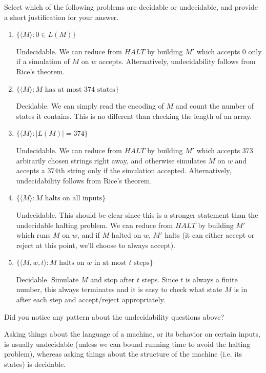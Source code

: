 \documentclass[fleqn]{article}
\begin{document}
\noindent Select which of the following problems are decidable or undecidable, and provide a short justification for your answer.
\begin{enumerate}
    \item $\{\langle M \rangle : 0 \in L(M)\}$
    \begin{answer}
        Undecidable. We can reduce from $HALT$ by building $M'$ which accepts $0$ only if a simulation of $M$ on $w$ accepts. Alternatively, undecidability follows from Rice's theorem.
    \end{answer}
    \item $\{\langle M \rangle : M\text{ has at most 374 states}\}$
    \begin{answer}
        Decidable. We can simply read the encoding of $M$ and count the number of states it contains. This is no different than checking the length of an array.
    \end{answer}
    \item $\{\langle M \rangle : |L(M)| = 374\}$
    \begin{answer}
        Undecidable. We can reduce from $HALT$ by building $M'$ which accepts $373$ arbirarily chosen strings right away, and otherwise simulates $M$ on $w$ and accepts a $374$th string only if the simulation accepted. Alternatively, undecidability follows from Rice's theorem.
    \end{answer}
    \item $\{\langle M \rangle : M\text{ halts on all inputs}\}$
    \begin{answer}
        Undecidable. This should be clear since this is a stronger statement than the undecidable halting problem. We can reduce from $HALT$ by building $M'$ which runs $M$ on $w$, and if $M$ halted on $w$, $M'$ halts (it can either accept or reject at this point, we'll choose to always accept).
    \end{answer}
    \item $\{\langle M, w, t \rangle : M\text{ halts on $w$ in at most $t$ steps}\}$
    \begin{answer}
        Decidable. Simulate $M$ and stop after $t$ steps. Since $t$ is always a finite number,
        this always terminates and it is easy to check what state $M$ is in after each step
        and accept/reject appropriately.
    \end{answer}
\end{enumerate}

\noindent Did you notice any pattern about the undecidability questions above?
\begin{answer}
    Asking things about the language of a machine, or its behavior on certain inputs, is usually undecidable (unless we can bound running time to avoid the halting problem), whereas asking things about the structure of the machine (i.e. its states) is decidable.
\end{answer}
\end{document}

